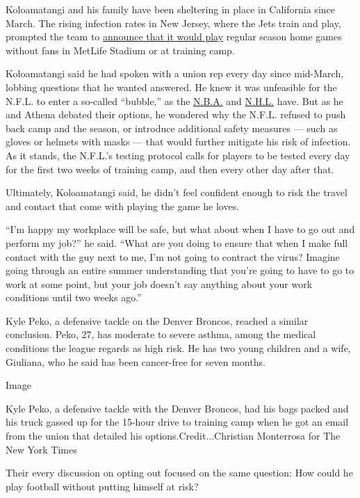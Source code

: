 Koloamatangi and his family have been sheltering in place in California
since March. The rising infection rates in New Jersey, where the Jets
train and play, prompted the team to
\href{https://www.nytimes.com/2020/07/20/sports/football/jets-giants-rutgers-fans-metlife-stadium.html}{announce
that it would play} regular season home games without fans in MetLife
Stadium or at training camp.

Koloamatangi said he had spoken with a union rep every day since
mid-March, lobbing questions that he wanted answered. He knew it was
unfeasible for the N.F.L. to enter a so-called ``bubble,'' as the
\href{https://www.nytimes.com/2020/07/22/sports/basketball/nba-bubble-practice.html}{N.B.A.}
and
\href{https://www.nytimes.com/2020/07/06/sports/hockey/nhl-playoffs.html}{N.H.L.}
have. But as he and Athena debated their options, he wondered why the
N.F.L. refused to push back camp and the season, or introduce additional
safety measures --- such as gloves or helmets with masks --- that would
further mitigate his risk of infection. As it stands, the N.F.L.'s
testing protocol calls for players to be tested every day for the first
two weeks of training camp, and then every other day after that.

Ultimately, Koloamatangi said, he didn't feel confident enough to risk
the travel and contact that come with playing the game he loves.

``I'm happy my workplace will be safe, but what about when I have to go
out and perform my job?'' he said. ``What are you doing to ensure that
when I make full contact with the guy next to me, I'm not going to
contract the virus? Imagine going through an entire summer understanding
that you're going to have to go to work at some point, but your job
doesn't say anything about your work conditions until two weeks ago.''

Kyle Peko, a defensive tackle on the Denver Broncos, reached a similar
conclusion. Peko, 27, has moderate to severe asthma, among the medical
conditions the league regards as high risk. He has two young children
and a wife, Giuliana, who he said has been cancer-free for seven months.

Image

Kyle Peko, a defensive tackle with the Denver Broncos, had his bags
packed and his truck gassed up for the 15-hour drive to training camp
when he got an email from the union that detailed his
options.Credit...Christian Monterrosa for The New York Times

Their every discussion on opting out focused on the same question: How
could he play football without putting himself at risk?

